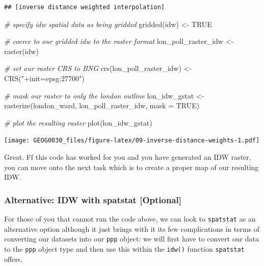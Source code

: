 \documentclass[
]{book}
\newenvironment{Shaded}{\begin{snugshade}}{\end{snugshade}}
\newcommand{\AttributeTok}[1]{\textcolor[rgb]{0.77,0.63,0.00}{#1}}
\newcommand{\CommentTok}[1]{\textcolor[rgb]{0.56,0.35,0.01}{\textit{#1}}}
\newcommand{\ConstantTok}[1]{\textcolor[rgb]{0.00,0.00,0.00}{#1}}
\newcommand{\FunctionTok}[1]{\textcolor[rgb]{0.00,0.00,0.00}{#1}}
\newcommand{\NormalTok}[1]{#1}
\newcommand{\OtherTok}[1]{\textcolor[rgb]{0.56,0.35,0.01}{#1}}
\newcommand{\StringTok}[1]{\textcolor[rgb]{0.31,0.60,0.02}{#1}}
\begin{document}
\begin{verbatim}
## [inverse distance weighted interpolation]
\end{verbatim}

\begin{Shaded}
\begin{Highlighting}[]
\CommentTok{\# specify idw spatial data as being gridded}
\FunctionTok{gridded}\NormalTok{(idw) }\OtherTok{\textless{}{-}} \ConstantTok{TRUE}

\CommentTok{\# coerce to our gridded idw to the raster format}
\NormalTok{lon\_poll\_raster\_idw }\OtherTok{\textless{}{-}} \FunctionTok{raster}\NormalTok{(idw)}

\CommentTok{\# set our raster CRS to BNG}
\FunctionTok{crs}\NormalTok{(lon\_poll\_raster\_idw) }\OtherTok{\textless{}{-}} \FunctionTok{CRS}\NormalTok{(}\StringTok{"+init=epsg:27700"}\NormalTok{)}

\CommentTok{\# mask our raster to only the london outline}
\NormalTok{lon\_idw\_gstat }\OtherTok{\textless{}{-}} \FunctionTok{rasterize}\NormalTok{(london\_ward, lon\_poll\_raster\_idw, }\AttributeTok{mask =} \ConstantTok{TRUE}\NormalTok{)}

\CommentTok{\# plot the resulting raster}
\FunctionTok{plot}\NormalTok{(lon\_idw\_gstat)}
\end{Highlighting}
\end{Shaded}

\texttt{[image: GEOG0030\_files/figure-latex/09-inverse-distance-weights-1.pdf]}

Great. Ff this code has worked for you and you have generated an IDW raster, you can move onto the next task which is to create a proper map of our resulting IDW.

\hypertarget{alternative-idw-with-spatstat-optional}{%
\subsubsection{Alternative: IDW with spatstat {[}Optional{]}}\label{alternative-idw-with-spatstat-optional}}

For those of you that cannot run the code above, we can look to \texttt{spatstat} as an alternative option although it just brings with it its few complications in terms of converting our datasets into our \texttt{ppp} object: we will first have to convert our data to the \texttt{ppp} object type and then use this within the \texttt{idw()} function \texttt{spatstat} offers.
\end{document}

